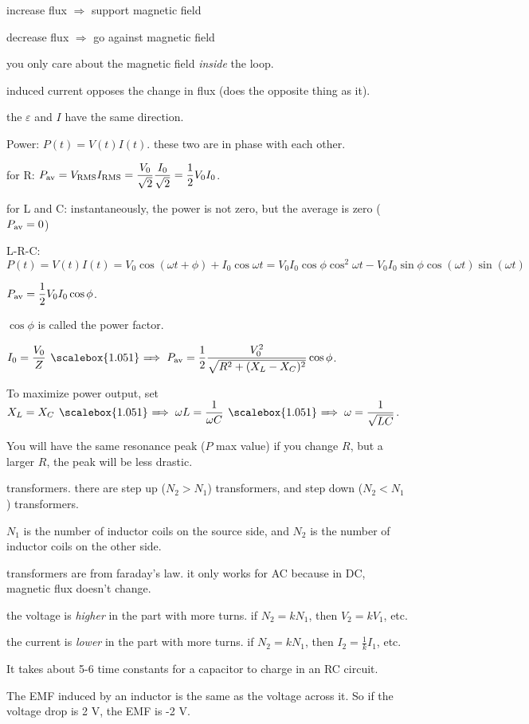 \documentclass[12pt]{article}
\newcommand \hpx [1]{\hspace{#1px}}
\newcommand \nhpx [1]{\hspace{-#1px}}
\renewcommand \implies {\hpx 4 \raisebox{-0.14px}{\scalebox{1.051} =} \nhpx{5.2} \Rightarrow \hpx 3}
\begin{document}
increase flux $\Rightarrow$ support magnetic field

decrease flux $\Rightarrow$ go against magnetic field

you only care about the magnetic field \emph{inside} the loop.

induced current opposes the change in flux (does the opposite thing as it).

the $\varepsilon$ and $I$ have the same direction.

Power: $P(t) = V(t) I(t)$. these two are in phase with each other.

for R: $P_{\rm av} = V_{\rm RMS} I_{\rm RMS} = \dfrac {V_0} {\sqrt 2} \dfrac {I_0} {\sqrt 2} = \dfrac 1 2 V_0 I_0$.

for L and C: instantaneously, the power is not zero, but the average is zero ($P_{\rm av} = 0$)

L-R-C: $P(t) = V(t) I(t) = V_0 \cos(\omega t + \phi) + I_0 \cos \omega t
= V_0 I_0 \cos \phi \cos^2 \omega t - V_0 I_0 \sin \phi \cos(\omega t) \sin(\omega t)$

$P_{\rm av} = \dfrac 1 2 V_0 I_0 \cos \phi$.

$\cos \phi$ is called the power factor.

$I_0 = \dfrac {V_0} Z \implies P_{\rm av} = \dfrac 1 2 \dfrac {V_0^2} {\sqrt{R^2 + (X_L - X_C)^2}} \cos \phi$.

To maximize power output, set $X_L = X_C
\implies \omega L = \dfrac 1 {\omega C}
\implies \omega = \dfrac 1 {\sqrt {L C}}$.

You will have the same resonance peak ($P$ max value) if you change $R$, but a larger $R$, the peak will be less drastic.

transformers. there are step up ($N_2 > N_1$) transformers, and step down ($N_2 < N_1$) transformers.

$N_1$ is the number of inductor coils on the source side, and $N_2$ is the number of inductor coils on the other side.

transformers are from faraday's law. it only works for AC because in DC, magnetic flux doesn't change.

\newpage

the voltage is \emph{higher} in the part with more turns. if $N_2 = k N_1$, then $V_2 = k V_1$, etc.

the current is \emph{lower} in the part with more turns. if $N_2 = k N_1$, then $I_2 = \frac 1 k I_1$, etc.

It takes about 5-6 time constants for a capacitor to charge in an RC circuit.

The EMF induced by an inductor is the same as the voltage across it. So if the voltage drop is 2 V, the EMF is -2 V.

\end{document}
